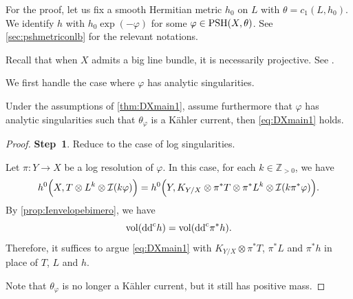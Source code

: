 For the proof, let us fix a smooth Hermitian metric $h_0$ on $L$ with $\theta=c_1(L,h_0)$. We identify $h$ with $h_0\exp(-\varphi)$ for some $\varphi\in \mathrm{PSH}(X,\theta)$. See \cref{sec:pshmetriconlb} for the relevant notations.

Recall that when $X$ admits a big line bundle, it is necessarily projective. See \cite[Theorem~2.2.26]{MM07}.

We first handle the case where $\varphi$ has analytic singularities.
\begin{proposition}\label{prop:DXmainanalytic}
    Under the assumptions of \cref{thm:DXmain1}, assume furthermore that $\varphi$ has analytic singularities such that $\theta_{\varphi}$ is a Kähler current, then \eqref{eq:DXmain1} holds.
\end{proposition}
\begin{proof}
    \textbf{Step~1}. Reduce to the case of log singularities.

    Let $\pi\colon Y\rightarrow X$ be a log resolution of $\varphi$. In this case, for each $k\in \mathbb{Z}_{>0}$, we have
    \[
        h^0\Bigl(X,T\otimes L^k\otimes \mathcal{I}(k\varphi)\Bigr)=h^0\Bigl(Y,K_{Y/X}\otimes \pi^*T\otimes \pi^*L^k\otimes \mathcal{I}(k\pi^*\varphi)\Bigr).
    \]
    By \cref{prop:Ienvelopebimero}, we have
    \[
        \operatorname{vol}(\mathrm{dd}^{\mathrm{c}} h)=\operatorname{vol} (\mathrm{dd}^{\mathrm{c}} \pi^*h).
    \]
    Therefore, it suffices to argue \eqref{eq:DXmain1} with $K_{Y/X}\otimes \pi^*T$, $\pi^*L$ and $\pi^*h$ in place of $T$, $L$ and $h$.

    Note that $\theta_{\varphi}$ is no longer a Kähler current, but it still has positive mass.


\end{proof}
